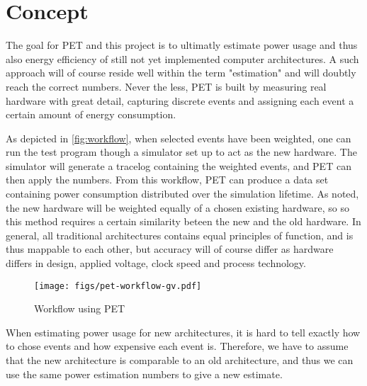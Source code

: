 \section{Concept}
The goal for PET and this project is to ultimatly estimate power usage and thus
also energy efficiency of still not yet implemented computer architectures. A
such approach will of course reside well within the term "estimation" and will
doubtly reach the correct numbers. Never the less, PET is built by measuring
real hardware with great detail, capturing discrete events and assigning each
event a certain amount of energy consumption.

As depicted in \autoref{fig:workflow}, when selected events have been weighted,
one can run the test program though a simulator set up to act as the new
hardware.  The simulator will generate a tracelog containing the weighted
events, and PET can then apply the numbers. From this workflow, PET can produce
a data set containing power consumption distributed over the simulation
lifetime.  As noted, the new hardware will be weighted equally of a chosen
existing hardware, so so this method requires a certain similarity beteen the
new and the old hardware. In general, all traditional architectures contains
equal principles of function, and is thus mappable to each other, but accuracy
will of course differ as hardware differs in design, applied voltage, clock
speed and process technology.

\begin{figure}
    \texttt{[image: figs/pet-workflow-gv.pdf]}
    \caption{Workflow using PET}
    \label{fig:workflow}
\end{figure}

When estimating power usage for new architectures, it is hard to tell exactly
how to chose events and how expensive each event is. Therefore, we have to
assume that the new architecture is comparable to an old architecture, and thus
we can use the same power estimation numbers to give a new estimate.
